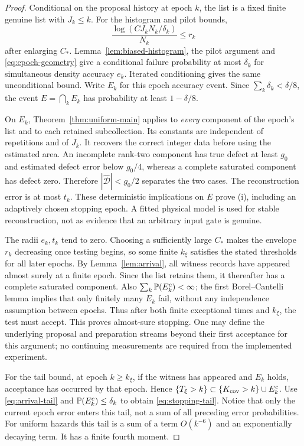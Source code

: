 \begin{proof}
Conditional on the proposal history at epoch $k$, the list is a fixed
finite genuine list with $J_k\le k$. For the histogram and pilot bounds,
\[
 \frac{\log(CJ_kN_k/\delta_k)}{N_k}\le r_k
\]
after enlarging $C_*$. Lemma~\ref{lem:biased-histogram}, the pilot argument
and \eqref{eq:epoch-geometry} give a conditional failure probability at
most $\delta_k$ for simultaneous density accuracy $e_k$. Iterated
conditioning gives the same unconditional bound. Write $E_k$ for this
epoch accuracy event. Since $\sum_k\delta_k<\delta/8$, the event
$E=\bigcap_kE_k$ has probability at least $1-\delta/8$.

On $E_k$, Theorem~\ref{thm:uniform-main} applies to \emph{every} component
of the epoch's list and to each retained subcollection. Its constants
are independent of repetitions and of $J_k$. It recovers the correct
integer data before using the estimated area. An incomplete rank-two
component has true defect at least $g_0$ and estimated defect error below
$g_0/4$, whereas a complete saturated component has defect zero. Therefore
$|\widehat{\mathcal D}|<g_0/2$ separates the two cases. The reconstruction
error is at most $t_k$. These deterministic implications on $E$ prove
(i), including an adaptively chosen stopping epoch. A fitted physical
model is used for stable reconstruction, not as evidence that an arbitrary
input gate is genuine.

The radii $e_k,t_k$ tend to zero. Choosing a sufficiently large $C_*$
makes the envelope $r_k$ decreasing once testing begins, so some finite
$k_\xi$ satisfies the stated thresholds for all later epochs. By
Lemma~\ref{lem:arrival}, all witness records have appeared almost surely
at a finite epoch. Since the list retains them, it thereafter has a
complete saturated component. Also $\sum_k\mathbb P(E_k^c)<\infty$;
the first Borel--Cantelli lemma implies that only finitely many $E_k$
fail, without any independence assumption between epochs. Thus after
both finite exceptional times and $k_\xi$, the test must accept. This
proves almost-sure stopping. One may define the underlying proposal and
preparation streams beyond their first acceptance for this argument;
no continuing measurements are required from the implemented experiment.

For the tail bound, at epoch $k\ge k_\xi$, if the witness has appeared
and $E_k$ holds, acceptance has occurred by that epoch. Hence
$\{T_\xi>k\}\subset\{K_{\rm cov}>k\}\cup E_k^c$.
Use \eqref{eq:arrival-tail} and $\mathbb P(E_k^c)\le\delta_k$ to obtain
\eqref{eq:stopping-tail}. Notice that only the current epoch error enters
this tail, not a sum of all preceding error probabilities. For uniform
hazards this tail is a sum of a term $O(k^{-6})$ and an exponentially
decaying term. It has a finite fourth moment.


\end{proof}
